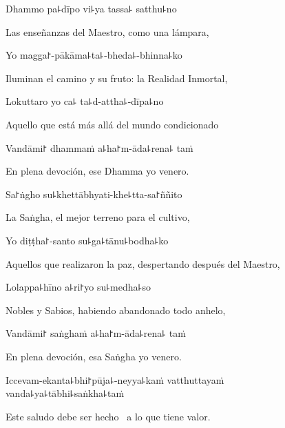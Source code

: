 Dhammo pa꜕dīpo vi꜕ya tassa꜕ satthu꜕no

\begin{english}
  Las enseñanzas del Maestro, como una lámpara,
\end{english}

Yo magga꜓-pākāma꜕ta꜕-bheda꜕-bhinna꜕ko

\begin{english}
  Iluminan el camino y su fruto: la Realidad Inmortal,
\end{english}

Lokuttaro yo ca꜕ ta꜕d-attha꜕-dīpa꜕no

\begin{english}
  Aquello que está más allá del mundo condicionado 
\end{english}

Vandāmi꜓ dhammaṁ a꜕ha꜓m-āda꜕rena꜕ taṁ

\begin{english}
  En plena devoción, ese Dhamma yo venero.
\end{english}

Sa꜓ṅgho su꜕khettābhyati-khe꜕tta-sa꜓ññito

\begin{english}
  La Saṅgha, el mejor terreno para el cultivo,
\end{english}

Yo diṭṭha꜓-santo su꜕ga꜕tānu꜕bodha꜕ko

\begin{english}
  Aquellos que realizaron la paz, despertando después del Maestro,
\end{english}

Lolappa꜕hīno a꜕ri꜓yo su꜕medha꜕so

\begin{english}
  Nobles y Sabios, habiendo abandonado todo anhelo, 
\end{english}

Vandāmi꜓ saṅghaṁ a꜕ha꜓m-āda꜕rena꜕ taṁ

\begin{english}
 En plena devoción, esa Saṅgha yo venero.
\end{english}

Iccevam-ekanta꜕bhi꜓pūja꜕-neyya꜕kaṁ vatthuttayaṁ \\vanda꜕ya꜕tābhi꜕saṅkha꜕taṁ

\begin{english}
 Este saludo debe ser hecho \pause\ a lo que tiene valor.
\end{english}

